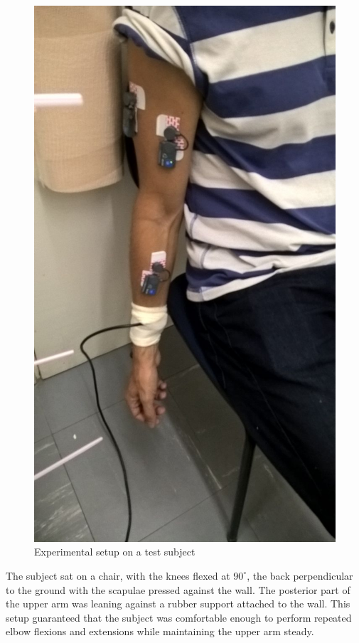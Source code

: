 \documentclass[letterpaper, 10 pt, conference]{ieeeconf}  %
\begin{document}
\begin{figure}[thpb]
      \centering
      \includegraphics[scale=0.32]{Images/Experiment_Image.jpg}
      \caption{Experimental setup on a test subject}
      \label{Experimental Setup}
   \end{figure}

The subject sat on a chair, with the knees flexed at \(90^{\circ}\), the back perpendicular to the ground with the scapulae pressed against the wall. The posterior part of the upper arm was leaning against a rubber support attached to the wall. This setup guaranteed that the subject was comfortable enough to perform repeated elbow flexions and extensions while maintaining the upper arm steady. 
\end{document}

